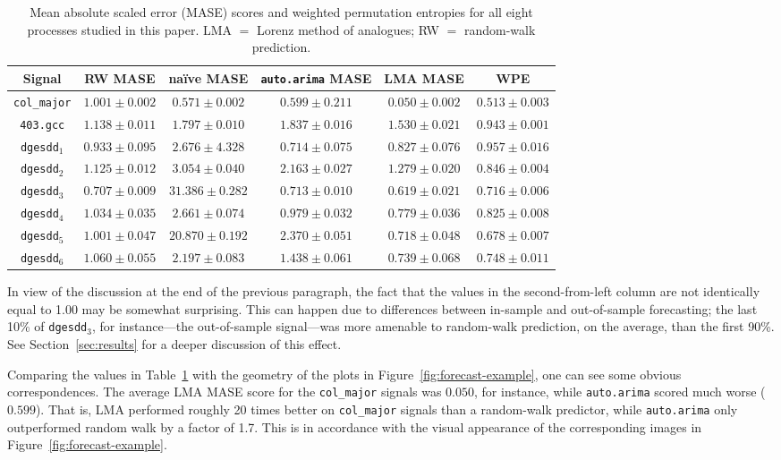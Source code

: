 \documentclass[%
pre,
reprint,
superscriptaddress,
showpacs,
nofootinbib,
nobibnotes,
 amsmath,amssymb,
 aps,
]{revtex4-1}
\newcommand{\gcc}{{\tt 403.gcc}\xspace}
\newcommand{\svdone}{{\tt dgesdd}$_1$\xspace}
\newcommand{\svdtwo}{{\tt dgesdd$_2$}\xspace}
\newcommand{\svdthree}{{\tt dgesdd$_3$}\xspace}
\newcommand{\svdfour}{{\tt dgesdd$_4$}\xspace}
\newcommand{\svdfive}{{\tt dgesdd$_5$}\xspace}
\newcommand{\svdsix}{{\tt dgesdd$_6$}\xspace}
\newcommand{\arima}{{\tt auto.arima}\xspace}
\newcommand{\col}{{\tt col\_major}\xspace}
\begin{document}
 \begin{table}
\caption{Mean absolute scaled error (MASE) scores and weighted
  permutation entropies for all eight processes studied in this paper.
  LMA $=$ Lorenz method of analogues; RW $=$ random-walk prediction.
  }
  \begin{center}
  \begin{tabular*}{\textwidth}{@{\extracolsep{\fill} } cccccc}
  \hline\hline 
Signal & RW MASE & na\"{i}ve MASE & \arima MASE & LMA MASE & WPE \\
\hline
  \col       & $1.001 \pm 0.002$ & $0.571 \pm 0.002$  & $0.599 \pm 0.211$ & $0.050 \pm 0.002$ & $0.513 \pm 0.003$ \\
  \gcc       & $1.138 \pm 0.011$ & $1.797 \pm 0.010$  & $1.837 \pm 0.016$ & $1.530 \pm 0.021$ & $0.943 \pm 0.001$ \\
  \svdone    & $0.933 \pm 0.095$ & $2.676 \pm 4.328$  & $0.714 \pm 0.075$ & $0.827 \pm 0.076$ & $0.957 \pm 0.016$ \\
  \svdtwo    & $1.125 \pm 0.012$ & $3.054 \pm 0.040$  & $2.163 \pm 0.027$ & $1.279 \pm 0.020$ & $0.846 \pm 0.004$ \\
  \svdthree  & $0.707 \pm 0.009$ & $31.386 \pm 0.282$ & $0.713 \pm 0.010$ & $0.619 \pm 0.021$ & $0.716 \pm 0.006$ \\
  \svdfour   & $1.034 \pm 0.035$ & $2.661 \pm 0.074$  & $0.979 \pm 0.032$ & $0.779 \pm 0.036$ & $0.825 \pm 0.008$ \\
  \svdfive   & $1.001 \pm 0.047$ & $20.870 \pm 0.192$ & $2.370 \pm 0.051$ & $0.718 \pm 0.048$ & $0.678 \pm 0.007$ \\
  \svdsix    & $1.060 \pm 0.055$ & $2.197 \pm 0.083$  & $1.438 \pm 0.061$ & $0.739 \pm 0.068$ & $0.748 \pm 0.011$ \\  
    \hline\hline
  \end{tabular*}
  \end{center}
 \label{tab:error}
  \end{table}%
In view of the discussion at the end of the previous paragraph, the
fact that the values in the second-from-left column are not
identically equal to 1.00 may be somewhat surprising.  This can happen
due to differences between in-sample and out-of-sample forecasting;
the last 10\% of \svdthree, for instance---the out-of-sample
signal---was more amenable to random-walk prediction, on the average,
than the first 90\%.  See Section~\ref{sec:results} for a deeper
discussion of this effect.

Comparing the values in Table~\ref{tab:error} with the geometry of the
plots in Figure~\ref{fig:forecast-example}, one can see some obvious
correspondences.  The average LMA MASE score for the \col signals was
$0.050$, for instance, while \arima scored much worse ($0.599$).  That
is, LMA performed roughly 20 times better on \col signals than a
random-walk predictor, while \arima only outperformed random walk by a
factor of 1.7.  This is in accordance with the visual appearance of
the corresponding images in Figure~\ref{fig:forecast-example}.  
\end{document}
